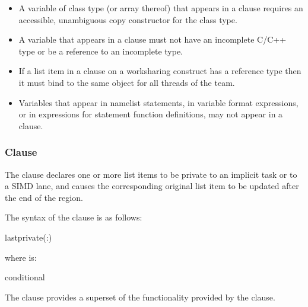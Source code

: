 {{{{\begin{itemize}
\cppspecificstart
\item A variable of class type (or array thereof) that appears in a  clause 
requires an accessible, unambiguous copy constructor for the class type.
\cppspecificend

\ccppspecificstart
\item A variable that appears in a  clause must not have an incomplete C/C++ type or be a reference to an incomplete type.

\item If a list item in a  clause on a worksharing
construct has a reference type then it must bind to the same object for all threads of the team.
\ccppspecificend

\fortranspecificstart
\item Variables that appear in namelist statements, in variable format expressions, or in 
expressions for statement function definitions, may not appear in a  
clause. 
\fortranspecificend
\end{itemize}










\subsubsection{ Clause}
\label{subsubsec:lastprivate clause}
\summary
The  clause declares one or more list items to be private to an implicit 
task or to a SIMD lane, and causes the corresponding original list item to be updated 
after the end of the region. 

\syntax
The syntax of the  clause is as follows:

\begin{boxedcode}
lastprivate(\plc{[ lastprivate-modifier}:\plc{] list})
\end{boxedcode}

where  is:
\begin{indentedcodelist}
conditional
\end{indentedcodelist}

\descr
The  clause provides a superset of the functionality provided by the 
 clause.

}}}}
